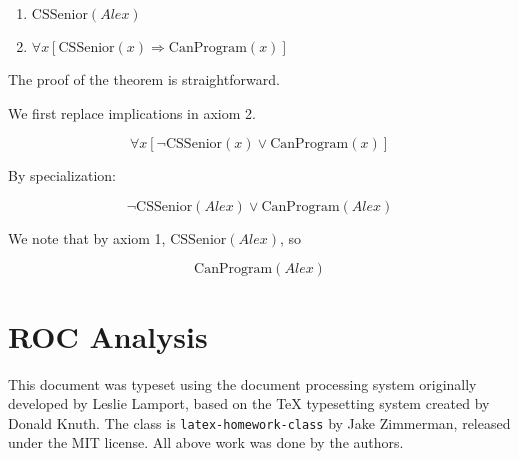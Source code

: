 \documentclass[11pt,largemargins, anonymous]{homework}
\begin{document}
\begin{enumerate}
    \item \( \mathrm{CSSenior}(Alex) \)
    \item \( \forall x [\mathrm{CSSenior}(x) \Rightarrow \mathrm{CanProgram}(x)] \)
\end{enumerate}

The proof of the theorem is straightforward.

We first replace implications in axiom 2.

\[ \forall x [\neg \mathrm{CSSenior}(x) \lor \mathrm{CanProgram}(x)] \]

By specialization:

\[ \neg \mathrm{CSSenior}(Alex) \lor \mathrm{CanProgram}(Alex) \]

We note that by axiom 1, \( \mathrm{CSSenior}(Alex) \), so

\[ \mathrm{CanProgram}(Alex) \]



\part{ROC Analysis}


\begin{colophon}
    This document was typeset using the \LaTeXe{} document processing system
    originally developed by Leslie Lamport, based on the \TeX{} typesetting system
    created by Donald Knuth.
    The class is \texttt{latex-homework-class} by Jake Zimmerman,
    released under the MIT license.
    All above work was done by the authors.
\end{colophon}
\end{document}
